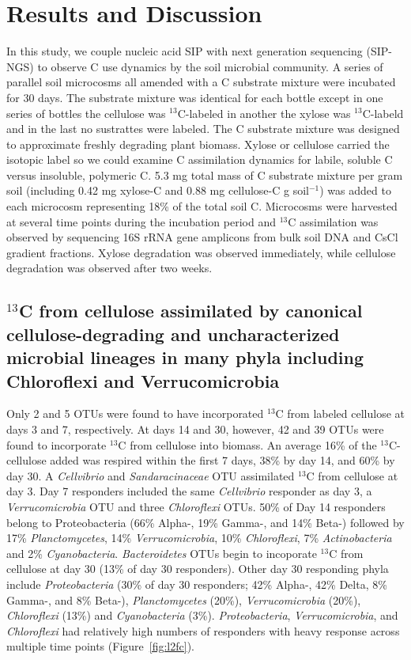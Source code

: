 \section{Results and Discussion}
In this study, we couple nucleic acid SIP with next generation sequencing
(SIP-NGS) to observe C use dynamics by the soil microbial community. A series
of parallel soil microcosms all amended with a C substrate mixture were
incubated for 30 days. The substrate mixture was identical for each bottle
except in one series of bottles the cellulose was $^{13}$C-labeled in another
the xylose was $^{13}$C-labeld and in the last no sustrattes were labeled. The
C substrate mixture was designed to approximate freshly degrading plant
biomass. Xylose or cellulose carried the isotopic label so we could examine C
assimilation dynamics for labile, soluble C versus insoluble, polymeric C. 5.3
mg total mass of C substrate mixture per gram soil (including 0.42 mg xylose-C
and 0.88 mg cellulose-C g soil$^{-1}$) was added to each microcosm representing
18\% of the total soil C. Microcosms were harvested at several time points
during the incubation period and $^{13}$C assimilation was observed by
sequencing 16S rRNA gene amplicons from bulk soil DNA and CsCl gradient
fractions. Xylose degradation was observed immediately, while cellulose
degradation was observed after two weeks.

\subsection{$^{13}$C from cellulose assimilated by canonical
cellulose-degrading and uncharacterized microbial lineages in many phyla
including Chloroflexi and Verrucomicrobia} 
Only 2 and 5 OTUs were found to have incorporated $^{13}$C from labeled
cellulose at days 3 and 7, respectively. At days 14 and 30, however, 42 and 39
OTUs were found to incorporate $^{13}$C from cellulose into biomass. An average
16\% of the $^{13}$C-cellulose added was respired within the first 7 days, 38\%
by day 14, and 60\% by day 30. A \textit{Cellvibrio} and
\textit{Sandaracinaceae} OTU assimilated $^{13}$C from cellulose at day 3. Day
7 responders included the same \textit{Cellvibrio} responder as day 3, a
\textit{Verrucomicrobia} OTU and three \textit{Chloroflexi} OTUs. 50\% of Day
14 responders belong to Proteobacteria (66\% Alpha-, 19\% Gamma-, and 14\%
Beta-) followed by 17\% \textit{Planctomycetes}, 14\% \textit{Verrucomicrobia},
10\% \textit{Chloroflexi}, 7\% \textit{Actinobacteria} and 2\%
\textit{Cyanobacteria}. \textit{Bacteroidetes} OTUs begin to incoporate
$^{13}$C from cellulose at day 30 (13\% of day 30 responders). Other day 30
responding phyla include \textit{Proteobacteria} (30\% of day 30 responders;
42\% Alpha-, 42\% Delta, 8\% Gamma-, and 8\% Beta-), \textit{Planctomycetes}
(20\%), \textit{Verrucomicrobia} (20\%), \textit{Chloroflexi} (13\%) and
\textit{Cyanobacteria} (3\%). \textit{Proteobacteria},
\textit{Verrucomicrobia}, and \textit{Chloroflexi} had relatively high numbers
of responders with heavy response across multiple time points (Figure~\ref{fig:l2fc}).

